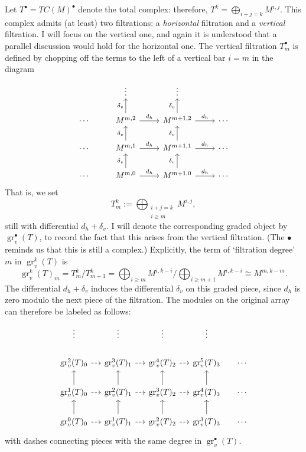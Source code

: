 Let $T^\bullet = TC(M)^\bullet$ denote the total complex: therefore,
$T^k = \bigoplus_{i+j=k} M^{i,j}$. This complex admits (at least) two
filtrations: a \emph{horizontal} filtration and a \emph{vertical}
filtration. I will focus on the vertical one, and again it is
understood that a parallel discussion would hold for the horizontal
one. The vertical filtration $T^\bullet_m$ is defined by chopping off
the terms to the left of a vertical bar $i = m$ in the diagram
\[\begin{tikzcd}
    & \vdots & \vdots & \\
    \cdots & M^{m,2} \arrow[r,"d_h"] \arrow[u,"\delta_v"] & M^{m+1,2} \arrow[r,"d_h"] \arrow[u,"\delta_v"] & \cdots \\
    \cdots & M^{m,1} \arrow[r,"d_h"] \arrow[u,"\delta_v"] & M^{m+1,1} \arrow[r,"d_h"] \arrow[u,"\delta_v"] & \cdots \\
    \cdots & M^{m,0} \arrow[r,"d_h"] \arrow[u,"\delta_v"] & M^{m+1,0}
    \arrow[r,"d_h"] \arrow[u,"\delta_v"] & \cdots
  \end{tikzcd}\] That is, we set
\[
  T_m^k := \bigoplus_{\substack{i+j=k\\i \ge m}} M^{i,j},
\]
still with differential $d_h + \delta_v$. I will denote the
corresponding graded object by $\operatorname{gr}^\bullet_v(T)$, to
record the fact that this arises from the vertical filtration. (The
$\bullet$ reminds us that this is still a complex.) Explicitly, the
term of `filtration degree' $m$ in $\operatorname{gr}^k_v(T)$ is
\[
  \operatorname{gr}^k_v(T)_m = T_m^k / T_{m+1}^k = \bigoplus_{i \ge m}
  M^{i,k-i} \Big/ \bigoplus_{i \ge m+1} M^{i,k-i} \cong M^{m,k-m}.
\]
The differential $d_h + \delta_v$ induces the differential $\delta_v$
on this graded piece, since $d_h$ is zero modulo the next piece of the
filtration. The modules on the original array can therefore be labeled
as follows:
\[\begin{tikzcd}[column sep=small]
    \vdots & \vdots & \vdots & \vdots & \\
    \operatorname{gr}^2_v(T)_0 \arrow[r,dashed] & \operatorname{gr}^3_v(T)_1 \arrow[r,dashed] & \operatorname{gr}^4_v(T)_2 \arrow[r,dashed] & \operatorname{gr}^5_v(T)_3 & \cdots \\
    \operatorname{gr}^1_v(T)_0 \arrow[u] \arrow[r,dashed] & \operatorname{gr}^2_v(T)_1 \arrow[u] \arrow[r,dashed] & \operatorname{gr}^3_v(T)_2 \arrow[u] \arrow[r,dashed] & \operatorname{gr}^4_v(T)_3 \arrow[u] & \cdots \\
    \operatorname{gr}^0_v(T)_0 \arrow[u] \arrow[r,dashed] &
    \operatorname{gr}^1_v(T)_1 \arrow[u] \arrow[r,dashed] &
    \operatorname{gr}^2_v(T)_2 \arrow[u] \arrow[r,dashed] &
    \operatorname{gr}^3_v(T)_3 \arrow[u] & \cdots
  \end{tikzcd}\] with dashes connecting pieces with the same degree in
$\operatorname{gr}^\bullet_v(T)$.


